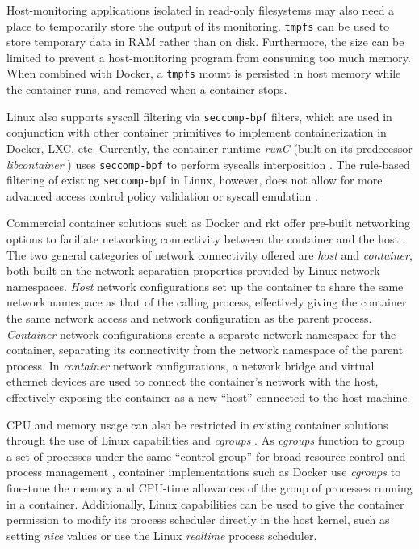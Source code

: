 \documentclass{proc}
\begin{document}
Host-monitoring applications isolated in read-only filesystems may also need a place to temporarily store the output of its monitoring. \texttt{tmpfs} can be used to store temporary data in RAM rather than on disk. Furthermore, the size can be limited to prevent a host-monitoring program from consuming too much memory. When combined with Docker, a \texttt{tmpfs} mount is persisted in host memory while the container runs, and removed when a container stops.

Linux also supports syscall filtering via \texttt{seccomp-bpf} filters, which are used in conjunction with other container primitives to implement containerization in Docker, LXC, etc. Currently, the container runtime \textit{runC} (built on its predecessor \textit{libcontainer} \cite{hykes2014libcontainer}) uses \texttt{seccomp-bpf} to perform syscalls interposition \cite{opencontainerinitiative}. The rule-based filtering of existing \texttt{seccomp-bpf} in Linux, however, does not allow for more advanced access control policy validation or syscall emulation \cite{seccompuserspace}.

Commercial container solutions such as Docker and rkt offer pre-built networking options to faciliate networking connectivity between the container and the host \cite{dockernetworking, rktnetworking}. The two general categories of network connectivity offered are \textit{host} and \textit{container}, both built on the network separation properties provided by Linux network namespaces. \textit{Host} network configurations set up the container to share the same network namespace as that of the calling process, effectively giving the container the same network access and network configuration as the parent process. \textit{Container} network configurations create a separate network namespace for the container, separating its connectivity from the network namespace of the parent process. In \textit{container} network configurations, a network bridge and virtual ethernet devices are used to connect the container's network with the host, effectively exposing the container as a new ``host'' connected to the host machine.

CPU and memory usage can also be restricted in existing container solutions through the use of Linux capabilities and \textit{cgroups} \cite{dockerconstraints}. As \textit{cgroups} function to group a set of processes under the same ``control group'' for broad resource control and process management \cite{menagecgroups}, container implementations such as Docker use \textit{cgroups} to fine-tune the memory and CPU-time allowances of the group of processes running in a container. Additionally, Linux capabilities can be used to give the container permission to modify its process scheduler directly in the host kernel, such as setting \textit{nice} values or use the Linux \textit{realtime} process scheduler.
\end{document}
